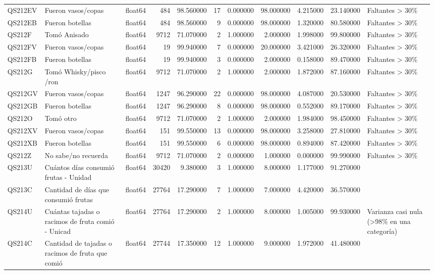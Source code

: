 \begin{longtable}{lllrrrrrrrl}
QS212EV & Fueron vasos/copas & float64 & 484 & 98.560000 & 17 & 0.000000 & 98.000000 & 4.215000 & 23.140000 & Faltantes > 30\% \\
QS212EB & Fueron botellas & float64 & 484 & 98.560000 & 9 & 0.000000 & 98.000000 & 1.320000 & 80.580000 & Faltantes > 30\% \\
QS212F & Tomó Anisado & float64 & 9712 & 71.070000 & 2 & 1.000000 & 2.000000 & 1.998000 & 99.800000 & Faltantes > 30\% \\
QS212FV & Fueron vasos/copas & float64 & 19 & 99.940000 & 7 & 0.000000 & 20.000000 & 3.421000 & 26.320000 & Faltantes > 30\% \\
QS212FB & Fueron botellas & float64 & 19 & 99.940000 & 3 & 0.000000 & 2.000000 & 0.158000 & 89.470000 & Faltantes > 30\% \\
QS212G & Tomó Whisky/pisco /ron & float64 & 9712 & 71.070000 & 2 & 1.000000 & 2.000000 & 1.872000 & 87.160000 & Faltantes > 30\% \\
QS212GV & Fueron vasos/copas & float64 & 1247 & 96.290000 & 22 & 0.000000 & 98.000000 & 4.087000 & 20.530000 & Faltantes > 30\% \\
QS212GB & Fueron botellas & float64 & 1247 & 96.290000 & 8 & 0.000000 & 98.000000 & 0.552000 & 89.170000 & Faltantes > 30\% \\
QS212O & Tomó otro & float64 & 9712 & 71.070000 & 2 & 1.000000 & 2.000000 & 1.984000 & 98.450000 & Faltantes > 30\% \\
QS212XV & Fueron vasos/copas & float64 & 151 & 99.550000 & 13 & 0.000000 & 98.000000 & 3.258000 & 27.810000 & Faltantes > 30\% \\
QS212XB & Fueron botellas & float64 & 151 & 99.550000 & 6 & 0.000000 & 98.000000 & 0.894000 & 87.420000 & Faltantes > 30\% \\
QS212Z & No sabe/no recuerda & float64 & 9712 & 71.070000 & 2 & 0.000000 & 1.000000 & 0.000000 & 99.990000 & Faltantes > 30\% \\
QS213U & Cuántos días consumió frutas - Unidad & float64 & 30420 & 9.380000 & 3 & 1.000000 & 8.000000 & 1.177000 & 91.270000 &  \\
QS213C & Cantidad de días que consumió frutas & float64 & 27764 & 17.290000 & 7 & 1.000000 & 7.000000 & 4.420000 & 36.570000 &  \\
QS214U & Cuántas tajadas o racimos de fruta comió - Unicad & float64 & 27764 & 17.290000 & 2 & 1.000000 & 8.000000 & 1.005000 & 99.930000 & Varianza casi nula (>98\% en una categoría) \\
QS214C & Cantidad de tajadas o racimos de fruta que comió & float64 & 27744 & 17.350000 & 12 & 1.000000 & 9.000000 & 1.972000 & 41.480000 &  \\

\end{longtable}
